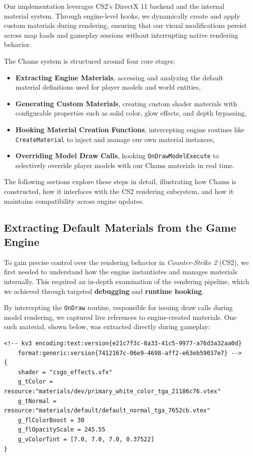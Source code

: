 Our implementation leverages CS2’s DirectX 11 backend and the internal material system. Through engine-level hooks, we dynamically create and apply custom materials during rendering, ensuring that our visual modifications persist across map loads and gameplay sessions without interrupting native rendering behavior.

The Chams system is structured around four core stages:

\begin{itemize}
    \item \textbf{Extracting Engine Materials}, accessing and analyzing the default material definitions used for player models and world entities,
    \item \textbf{Generating Custom Materials}, creating custom shader materials with configurable properties such as solid color, glow effects, and depth bypassing,
    \item \textbf{Hooking Material Creation Functions}, intercepting engine routines like \texttt{CreateMaterial} to inject and manage our own material instances,
    \item \textbf{Overriding Model Draw Calls}, hooking \texttt{OnDrawModelExecute} to selectively override player models with our Chams materials in real time.
\end{itemize}

The following sections explore these steps in detail, illustrating how Chams is constructed, how it interfaces with the CS2 rendering subsystem, and how it maintains compatibility across engine updates.

\subsection{Extracting Default Materials from the Game Engine}

To gain precise control over the rendering behavior in \textit{Counter-Strike 2} (CS2), we first needed to understand how the engine instantiates and manages materials internally. This required an in-depth examination of the rendering pipeline, which we achieved through targeted \textbf{debugging} and \textbf{runtime hooking}.

By intercepting the \texttt{OnDraw} routine, responsible for issuing draw calls during model rendering, we captured live references to engine-created materials. One such material, shown below, was extracted directly during gameplay:

\begin{lstlisting}[style=cppstyle, caption={Extracted Default Material from CS2}]
<!-- kv3 encoding:text:version{e21c7f3c-8a33-41c5-9977-a76d3a32aa0d}
    format:generic:version{7412167c-06e9-4698-aff2-e63eb59037e7} -->
{
    shader = "csgo_effects.vfx"
    g_tColor = resource:"materials/dev/primary_white_color_tga_21186c76.vtex"
    g_tNormal = resource:"materials/default/default_normal_tga_7652cb.vtex"
    g_flColorBoost = 30
    g_flOpacityScale = 245.55
    g_vColorTint = [7.0, 7.0, 7.0, 0.37522]
}
\end{lstlisting}

